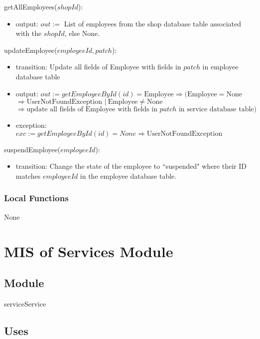 \documentclass[12pt, titlepage]{article}
\begin{document}
\noindent getAllEmployees($shopId$):
\begin{itemize}
	\item output: $out :=$ List of employees from the shop database table associated with the $shopId$, else
	      None.
\end{itemize}

\noindent updateEmployee($employeeId, patch$):
\begin{itemize}
	\item transition: Update all fields of Employee with fields in $patch$ in employee database table
	\item output: $out := getEmployeeById(id) = \text{Employee} \Rightarrow (\text{Employee} = \text{None} $
		      \\ $\Rightarrow \text{UserNotFoundException } |\ \text{Employee} \neq \text{None}$ \\ $\Rightarrow
		      \text{update all fields of Employee with fields in } patch \text{ in service database table})$
	\item exception: $exc := getEmployeeById(id) = None \Rightarrow \text{UserNotFoundException}$
\end{itemize}

\noindent suspendEmployee($employeeId$):
\begin{itemize}
	\item transition: Change the state of the employee to ``suspended" where their ID matches $employeeId$ in
	      the employee database table.
\end{itemize}

\subsubsection{Local Functions}

None

\newpage

\section{MIS of Services Module} \label{mServices}
\subsection{Module}

serviceService

\subsection{Uses}
\end{document}
